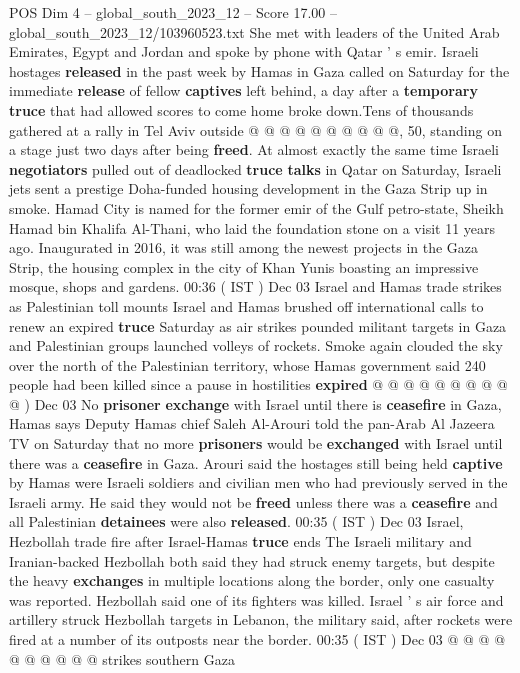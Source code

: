 \begin{textsample}{POS Dim 4 – global\_south\_2023\_12 – Score 17.00 – global\_south\_2023\_12/103960523.txt}
She met with leaders of the United Arab Emirates, Egypt and Jordan and spoke by phone with Qatar ' s emir.
Israeli hostages \textbf{released} in the past week by Hamas in Gaza called on Saturday for the immediate \textbf{release} of fellow \textbf{captives} left behind, a day after a \textbf{temporary} \textbf{truce} that had allowed scores to come home broke down.Tens of thousands gathered at a rally in Tel Aviv outside @ @ @ @ @ @ @ @ @ @, 50, standing on a stage just two days after being \textbf{freed}.
At almost exactly the same time Israeli \textbf{negotiators} pulled out of deadlocked \textbf{truce} \textbf{talks} in Qatar on Saturday, Israeli jets sent a prestige Doha-funded housing development in the Gaza Strip up in smoke.
Hamad City is named for the former emir of the Gulf petro-state, Sheikh Hamad bin Khalifa Al-Thani, who laid the foundation stone on a visit 11 years ago.
Inaugurated in 2016, it was still among the newest projects in the Gaza Strip, the housing complex in the city of Khan Yunis boasting an impressive mosque, shops and gardens. 00:36 ( IST ) Dec 03 Israel and Hamas trade strikes as Palestinian toll mounts Israel and Hamas brushed off international calls to renew an expired \textbf{truce} Saturday as air strikes pounded militant targets in Gaza and Palestinian groups launched volleys of rockets.
Smoke again clouded the sky over the north of the Palestinian territory, whose Hamas government said 240 people had been killed since a pause in hostilities \textbf{expired} @ @ @ @ @ @ @ @ @ @ ) Dec 03 No \textbf{prisoner} \textbf{exchange} with Israel until there is \textbf{ceasefire} in Gaza, Hamas says Deputy Hamas chief Saleh Al-Arouri told the pan-Arab Al Jazeera TV on Saturday that no more \textbf{prisoners} would be \textbf{exchanged} with Israel until there was a \textbf{ceasefire} in Gaza.
Arouri said the hostages still being held \textbf{captive} by Hamas were Israeli soldiers and civilian men who had previously served in the Israeli army.
He said they would not be \textbf{freed} unless there was a \textbf{ceasefire} and all Palestinian \textbf{detainees} were also \textbf{released}. 00:35 ( IST ) Dec 03 Israel, Hezbollah trade fire after Israel-Hamas \textbf{truce} ends The Israeli military and Iranian-backed Hezbollah both said they had struck enemy targets, but despite the heavy \textbf{exchanges} in multiple locations along the border, only one casualty was reported.
Hezbollah said one of its fighters was killed.
Israel ' s air force and artillery struck Hezbollah targets in Lebanon, the military said, after rockets were fired at a number of its outposts near the border. 00:35 ( IST ) Dec 03 @ @ @ @ @ @ @ @ @ @ strikes southern Gaza

\end{textsample}
